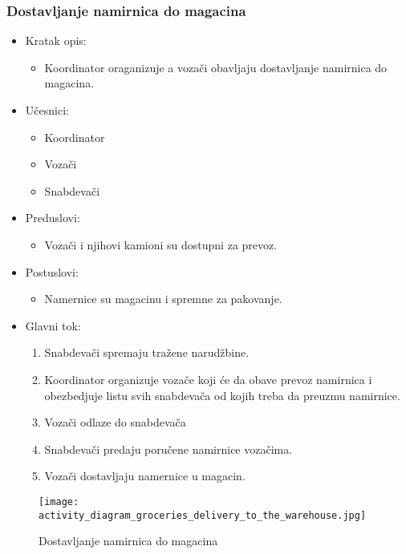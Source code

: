 \subsubsection{Dostavljanje namirnica do magacina}

\begin{itemize}
	\item Kratak opis:
		\begin{itemize}
			\item Koordinator oraganizuje a vozači obavljaju dostavljanje namirnica do magacina. 
		\end{itemize}
	\item Učesnici:
		\begin{itemize}
		    \item Koordinator
		    \item Vozači
		    \item Snabdevači
		\end{itemize}
	\item Preduslovi:
		\begin{itemize}
		   
		    \item Vozači i njihovi kamioni su dostupni za prevoz.
		\end{itemize}
	\item Postuslovi:
		\begin{itemize}
			\item Namernice su magacinu i spremne za pakovanje.
	\end{itemize}
	\item Glavni tok:
		\begin{enumerate}
		 \item Snabdevači spremaju tražene narudžbine.
		\item Koordinator organizuje vozače koji će da obave prevoz namirnica i obezbedjuje listu svih snabdevača od kojih treba da preuzmu namirnice.
            \item Vozači odlaze do snabdevača
            \item Snabdevači predaju poručene namirnice vozačima.
            \item Vozači dostavljaju namernice u magacin.
   
		\end{enumerate}
\end{itemize}
\begin{figure}[H]
\begin{center}
\texttt{[image: activity\_diagram\_groceries\_delivery\_to\_the\_warehouse.jpg]}
\end{center}
    \caption{Dostavljanje namirnica do magacina}
\label{fig:Activity_diagram_groceries_delivery_to_the_warehouse}
\end{figure}